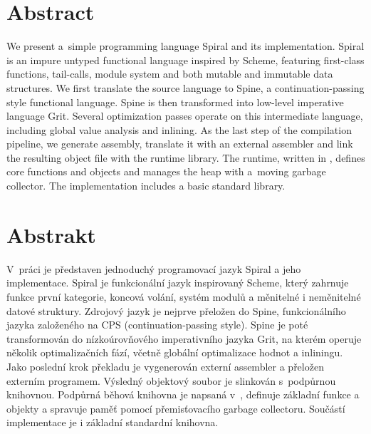 \begin{adjustwidth}{1.5cm}{1.5cm}

\section*{Abstract}

We present a~simple programming language Spiral and its implementation. Spiral
is an impure untyped functional language inspired by Scheme, featuring
first-class functions, tail-calls, module system and both mutable and immutable
data structures. We first translate the source language to Spine, a
continuation-passing style functional language. Spine is then transformed into
low-level imperative language Grit. Several optimization passes operate on this
intermediate language, including global value analysis and inlining. As the last
step of the compilation pipeline, we generate assembly, translate it with an
external assembler and link the resulting object file with the runtime library.
The runtime, written in \Cplusplus, defines core functions and objects and
manages the heap with a~moving garbage collector. The implementation includes a
basic standard library.

\section*{Abstrakt}

V~práci je představen jednoduchý programovací jazyk Spiral a jeho implementace.
Spiral je funkcionální jazyk inspirovaný Scheme, který zahrnuje funkce první
kategorie, koncová volání, systém modulů a měnitelné i neměnitelné datové
struktury. Zdrojový jazyk je nejprve přeložen do Spine, funkcionálního jazyka
založeného na CPS (continuation-passing style). Spine je poté transformován do
nízkoúrovňového imperativního jazyka Grit, na kterém operuje několik
optimalizačních fází, včetně globální optimalizace hodnot a inliningu.  Jako
poslední krok překladu je vygenerován externí assembler a přeložen externím
programem.  Výsledný objektový soubor je slinkován s~podpůrnou knihovnou.
Podpůrná běhová knihovna je napsaná v~\Cplusplus, definuje základní funkce a
objekty a spravuje paměť pomocí přemisťovacího garbage collectoru. Součástí
implementace je i základní standardní knihovna.

\end{adjustwidth}

\newpage

